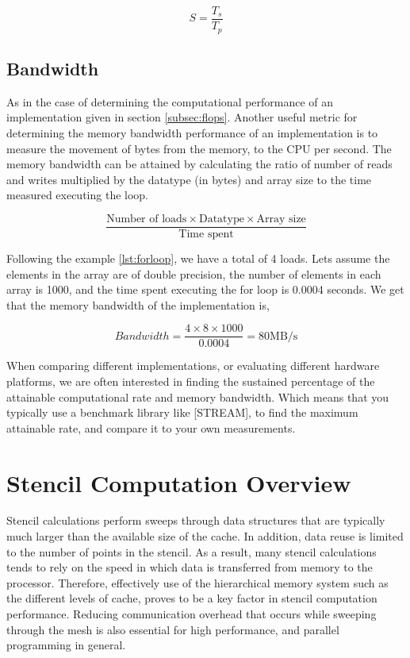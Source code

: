 \begin{equation} \label{speedup}
S = \frac{T_s}{T_p} 
\end{equation}

\subsection{Bandwidth}
As in the case of determining the computational performance of an implementation given in section \ref{subsec:flops}. Another useful metric for determining the memory bandwidth performance of an implementation is to measure the movement of bytes from the memory, to the CPU per second. The memory bandwidth can be attained by calculating the ratio of number of reads and writes multiplied by the datatype (in bytes) and array size to the time measured executing the loop.

\begin{equation} \label{bw}
\frac{\textrm{Number of loads} \times \textrm{Datatype}  \times \textrm{Array size}}{\textrm{Time spent}} 
\end{equation}

Following the example \ref{lst:forloop}, we have a total of 4 loads. Lets assume the elements in the array are of double precision, the number of elements in  each array is 1000, and the time spent executing the for loop is 0.0004 seconds. We get that the memory bandwidth of the implementation is, 

\begin{equation} \label{bwsolved}
Bandwidth = \frac{4 \times 8 \times 1000}{0.0004} =  80 \textrm {MB/s}
\end{equation}

When comparing different implementations, or evaluating different hardware platforms, we are often interested in finding the sustained percentage of the attainable computational rate and memory bandwidth. Which means that you typically use a benchmark library like [STREAM], to find the maximum attainable rate, and compare it to your own measurements.


\section{Stencil Computation Overview}
Stencil calculations perform sweeps through data structures that are typically much larger than the available size of the cache. In addition, data reuse is limited to the number of points in the stencil. As a result, many stencil calculations tends to rely on the speed in which data is transferred from memory to the processor. Therefore, effectively use of the hierarchical memory system such as the different levels of cache, proves to be a key factor in stencil computation performance. Reducing communication overhead that occurs while sweeping through the mesh is also essential for high performance, and parallel programming in general.

